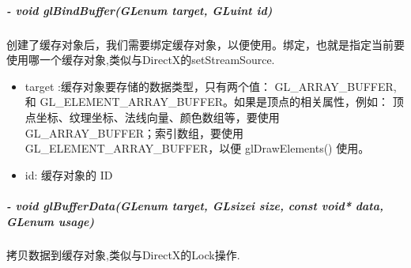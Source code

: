 \documentclass[UTF8,a4paper,8pt]{ctexart}
\begin{document}
			\subparagraph{- void glBindBuffer(GLenum target, GLuint id)}创建了缓存对象后，我们需要绑定缓存对象，以便使用。绑定，也就是指定当前要使用哪一个缓存对象,类似与DirectX的setStreamSource.
				\begin{itemize}
					\item target :缓存对象要存储的数据类型，只有两个值： GL\_ARRAY\_BUFFER, 和 GL\_ELEMENT\_ARRAY\_BUFFER。如果是顶点的相关属性，例如： 顶点坐标、纹理坐标、法线向量、颜色数组等，要使用 GL\_ARRAY\_BUFFER；索引数组，要使用 GL\_ELEMENT\_ARRAY\_BUFFER，以便 glDrawElements() 使用。
					
					\item id: 缓存对象的 ID
				\end{itemize}
			
			\subparagraph{- void glBufferData(GLenum target, GLsizei size, const void* data, GLenum usage)}拷贝数据到缓存对象,类似与DirectX的Lock操作.
\end{document}

